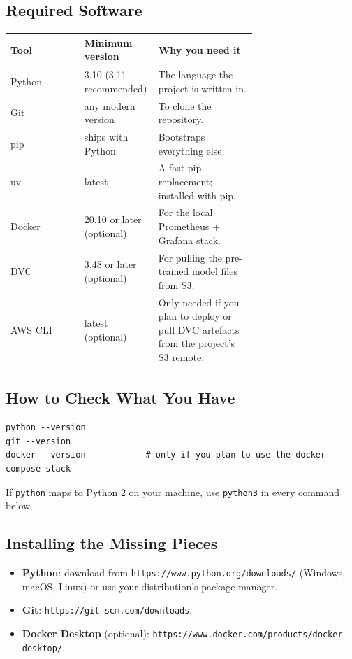 \documentclass[11pt,a4paper]{article}
\begin{document}
\subsection{Required Software}

\begin{longtable}{@{}lp{0.30\linewidth}p{0.4\linewidth}@{}}
\toprule
\textbf{Tool} & \textbf{Minimum version} & \textbf{Why you need it} \\ \midrule \endhead
Python   & 3.10 (3.11 recommended)        & The language the project is written in. \\
Git      & any modern version             & To clone the repository. \\
pip      & ships with Python              & Bootstraps everything else. \\
uv       & latest                         & A fast pip replacement; installed with pip. \\
Docker   & 20.10 or later (optional)      & For the local Prometheus + Grafana stack. \\
DVC      & 3.48 or later (optional)       & For pulling the pre-trained model files
                                            from S3. \\
AWS CLI  & latest (optional)              & Only needed if you plan to deploy or pull
                                            DVC artefacts from the project's S3 remote. \\
\bottomrule
\end{longtable}

\subsection{How to Check What You Have}

\begin{lstlisting}
python --version
git --version
docker --version            # only if you plan to use the docker-compose stack
\end{lstlisting}

\noindent If \texttt{python} maps to Python 2 on your machine, use \texttt{python3}
in every command below.

\subsection{Installing the Missing Pieces}

\begin{itemize}[leftmargin=*]
\item \textbf{Python}: download from \texttt{https://www.python.org/downloads/} (Windows,
      macOS, Linux) or use your distribution's package manager.
\item \textbf{Git}: \texttt{https://git-scm.com/downloads}.
\item \textbf{Docker Desktop} (optional): \texttt{https://www.docker.com/products/docker-desktop/}.
\end{itemize}
\end{document}
